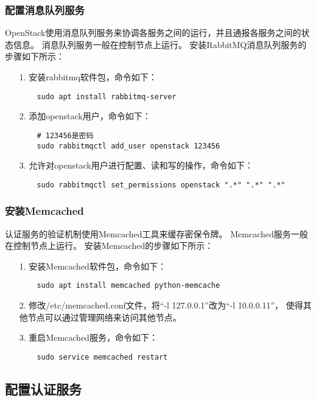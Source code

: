 \documentclass[a4paper,left=2.5cm,right=2.5cm,11pt]{article}
\begin{document}
\subsubsection{配置消息队列服务}
	OpenStack使用消息队列服务来协调各服务之间的运行，并且通报各服务之间的状态信息。
	消息队列服务一般在控制节点上运行。
	安装RabbitMQ消息队列服务的步骤如下所示：
	\begin{itemize}
		\item[1.] 安装rabbitmq软件包，命令如下：
		\begin{lstlisting}
	sudo apt install rabbitmq-server
		\end{lstlisting}

		\item[2.] 添加openstack用户，命令如下：
		\begin{lstlisting}
	# 123456是密码
	sudo rabbitmqctl add_user openstack 123456
		\end{lstlisting}

		\item[3.] 允许对openstack用户进行配置、读和写的操作，命令如下：
		\begin{lstlisting}
	sudo rabbitmqctl set_permissions openstack ".*" ".*" ".*"
		\end{lstlisting}
	\end{itemize}

\subsubsection{安装Memcached}
	认证服务的验证机制使用Memcached工具来缓存密保令牌。
	Memcached服务一般在控制节点上运行。
	安装Memcached的步骤如下所示：
	\begin{itemize}
		\item[1.] 安装Memcached软件包，命令如下：
		\begin{lstlisting}
	sudo apt install memcached python-memcache
		\end{lstlisting}

		\item[2.] 修改/etc/memcached.conf文件，将“-l 127.0.0.1”改为“-l 10.0.0.11”，
		使得其他节点可以通过管理网络来访问其他节点。

		\item[3.] 重启Memcached服务，命令如下：
		\begin{lstlisting}
	sudo service memcached restart
		\end{lstlisting}
	\end{itemize}

\subsection{配置认证服务}
\end{document}
